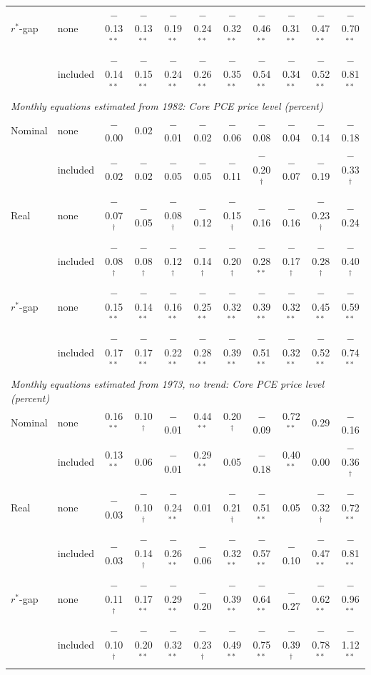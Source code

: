\begin{tabular}{llccccccccc}
$r^*$-gap & none & $-$0.13$^{**}$ & $-$0.13$^{**}$ & $-$0.19$^{**}$ & $-$0.24$^{**}$ & $-$0.32$^{**}$ & $-$0.46$^{**}$ & $-$0.31$^{**}$ & $-$0.47$^{**}$ & $-$0.70$^{**}$ \\
 & included & $-$0.14$^{**}$ & $-$0.15$^{**}$ & $-$0.24$^{**}$ & $-$0.26$^{**}$ & $-$0.35$^{**}$ & $-$0.54$^{**}$ & $-$0.34$^{**}$ & $-$0.52$^{**}$ & $-$0.81$^{**}$ \\
\midrule
\multicolumn{11}{l}{\textit{Monthly equations estimated from 1982: Core PCE price level (percent)}}\\
Nominal & none & $-$0.00 & 0.02 & $-$0.01 & $-$0.02 & $-$0.06 & $-$0.08 & $-$0.04 & $-$0.14 & $-$0.18 \\
 & included & $-$0.02 & $-$0.02 & $-$0.05 & $-$0.05 & $-$0.11 & $-$0.20$^{\dagger}$ & $-$0.07 & $-$0.19 & $-$0.33$^{\dagger}$ \\
Real & none & $-$0.07$^{\dagger}$ & $-$0.05 & $-$0.08$^{\dagger}$ & $-$0.12 & $-$0.15$^{\dagger}$ & $-$0.16 & $-$0.16 & $-$0.23$^{\dagger}$ & $-$0.24 \\
 & included & $-$0.08$^{\dagger}$ & $-$0.08$^{\dagger}$ & $-$0.12$^{\dagger}$ & $-$0.14$^{\dagger}$ & $-$0.20$^{\dagger}$ & $-$0.28$^{**}$ & $-$0.17$^{\dagger}$ & $-$0.28$^{\dagger}$ & $-$0.40$^{\dagger}$ \\
$r^*$-gap & none & $-$0.15$^{**}$ & $-$0.14$^{**}$ & $-$0.16$^{**}$ & $-$0.25$^{**}$ & $-$0.32$^{**}$ & $-$0.39$^{**}$ & $-$0.32$^{**}$ & $-$0.45$^{**}$ & $-$0.59$^{**}$ \\
 & included & $-$0.17$^{**}$ & $-$0.17$^{**}$ & $-$0.22$^{**}$ & $-$0.28$^{**}$ & $-$0.39$^{**}$ & $-$0.51$^{**}$ & $-$0.32$^{**}$ & $-$0.52$^{**}$ & $-$0.74$^{**}$ \\
\midrule
\multicolumn{11}{l}{\textit{Monthly equations estimated from 1973, no trend: Core PCE price level (percent)}}\\
Nominal & none & 0.16$^{**}$ & 0.10$^{\dagger}$ & $-$0.01 & 0.44$^{**}$ & 0.20$^{\dagger}$ & $-$0.09 & 0.72$^{**}$ & 0.29 & $-$0.16 \\
 & included & 0.13$^{**}$ & 0.06 & $-$0.01 & 0.29$^{**}$ & 0.05 & $-$0.18 & 0.40$^{**}$ & 0.00 & $-$0.36$^{\dagger}$ \\
Real & none & $-$0.03 & $-$0.10$^{\dagger}$ & $-$0.24$^{**}$ & 0.01 & $-$0.21$^{\dagger}$ & $-$0.51$^{**}$ & 0.05 & $-$0.32$^{\dagger}$ & $-$0.72$^{**}$ \\
 & included & $-$0.03 & $-$0.14$^{\dagger}$ & $-$0.26$^{**}$ & $-$0.06 & $-$0.32$^{**}$ & $-$0.57$^{**}$ & $-$0.10 & $-$0.47$^{**}$ & $-$0.81$^{**}$ \\
$r^*$-gap & none & $-$0.11$^{\dagger}$ & $-$0.17$^{**}$ & $-$0.29$^{**}$ & $-$0.20 & $-$0.39$^{**}$ & $-$0.64$^{**}$ & $-$0.27 & $-$0.62$^{**}$ & $-$0.96$^{**}$ \\
 & included & $-$0.10$^{\dagger}$ & $-$0.20$^{**}$ & $-$0.32$^{**}$ & $-$0.23$^{\dagger}$ & $-$0.49$^{**}$ & $-$0.75$^{**}$ & $-$0.39$^{\dagger}$ & $-$0.78$^{**}$ & $-$1.12$^{**}$ \\
\bottomrule
\end{tabular}
